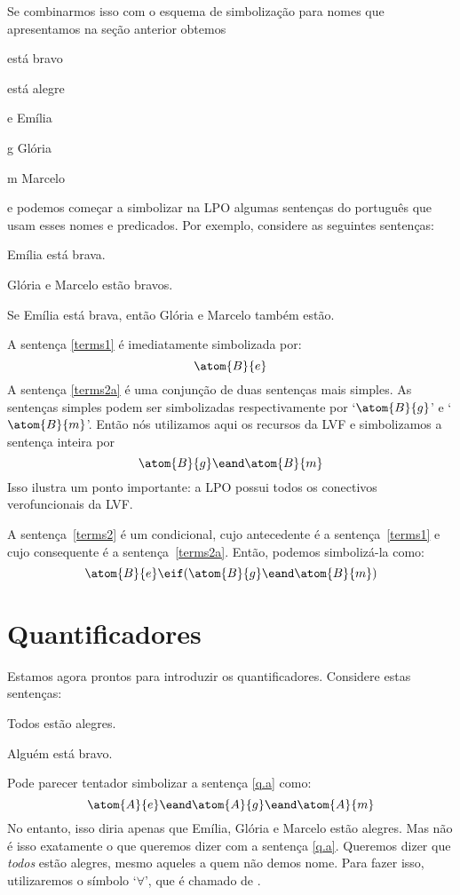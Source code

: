 Se combinarmos isso com o esquema de simbolização para nomes que apresentamos na seção anterior obtemos
	\begin{ekey}
		\item[\atom{B}{x}]  está bravo
		\item[\atom{A}{x}]  está alegre
		\item[e] Emília
		\item[g] Glória
		\item[m] Marcelo
	\end{ekey}
e podemos começar a simbolizar na LPO algumas sentenças do português que usam esses nomes e predicados.
Por exemplo, considere as seguintes sentenças:
	\begin{earg}
		\item[\ex{terms1}] Emília está brava.
		\item[\ex{terms2a}] Glória e Marcelo estão bravos.
		\item[\ex{terms2}] Se Emília está brava, então Glória e Marcelo também estão.
	\end{earg}

A sentença \ref{terms1} é imediatamente simbolizada por:
$$\atom{B}{e}$$
A sentença \ref{terms2a} é uma conjunção de duas sentenças mais simples.
As sentenças simples podem ser simbolizadas respectivamente por `$\atom{B}{g}$' e `$\atom{B}{m}$'.
Então nós utilizamos aqui os recursos da LVF e simbolizamos a sentença inteira por
$$\atom{B}{g} \eand \atom{B}{m}$$
Isso ilustra um ponto importante:
a LPO possui todos os conectivos verofuncionais da LVF.

A sentença~\ref{terms2} é um condicional, cujo antecedente é a sentença~\ref{terms1} e cujo consequente é a sentença~\ref{terms2a}.
Então, podemos simbolizá-la como:
$$\atom{B}{e} \eif (\atom{B}{g} \eand \atom{B}{m})$$


\section{Quantificadores}
Estamos agora prontos para introduzir os quantificadores.
Considere estas sentenças:
	\begin{earg}
		\item[\ex{q.a}] Todos estão alegres.
		\item[\ex{q.e}] Alguém está bravo.
	\end{earg}
Pode parecer tentador simbolizar a sentença \ref{q.a} como:
$$\atom{A}{e} \eand \atom{A}{g} \eand \atom{A}{m}$$
No entanto, isso diria apenas que Emília, Glória e Marcelo estão alegres.
Mas não é isso exatamente o que queremos dizer com a sentença \ref{q.a}.
Queremos dizer que \emph{todos} estão alegres, mesmo aqueles a quem não demos nome.
Para fazer isso, utilizaremos o símbolo `$\forall$', que é chamado de .

